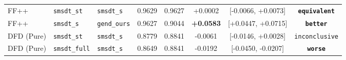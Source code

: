 \begin{table}[t]
\begin{tabular}{l l l c c c c c}
FF++     & \texttt{smsdt\_st}   & \texttt{smsdt\_s}    & 0.9629 & 0.9627 & +0.0002 & [-0.0066, +0.0073] & \textbf{\texttt{equivalent}} \\
FF++     & \texttt{smsdt\_s}    & \texttt{gend\_ours} & 0.9627 & 0.9044 & \textbf{+0.0583} & [+0.0447, +0.0715] & \textbf{\texttt{better}} \\
\midrule
DFD (Pure) & \texttt{smsdt\_st} & \texttt{smsdt\_s}    & 0.8779 & 0.8841 & -0.0061 & [-0.0146, +0.0028] & \texttt{inconclusive} \\
DFD (Pure) & \texttt{smsdt\_full} & \texttt{smsdt\_s}  & 0.8649 & 0.8841 & -0.0192 & [-0.0450, -0.0207] & \textbf{\texttt{worse}} \\
\bottomrule
\end{tabular}
\end{table}

